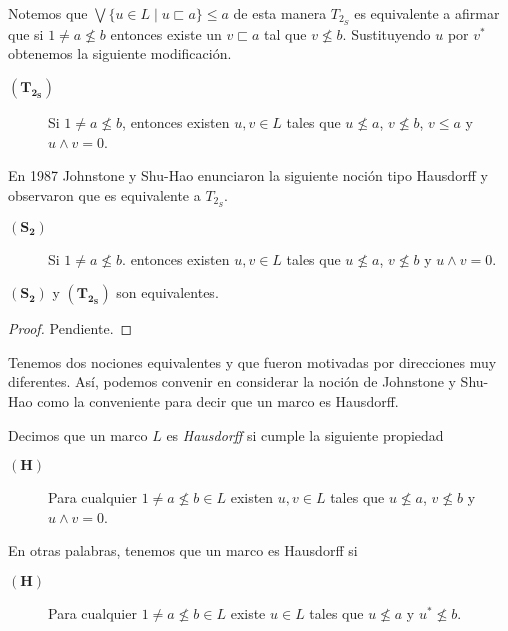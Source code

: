 Notemos que $\bigvee\{u\in L\mid u\sqsubset a\}\leq a$ de esta manera $T_{2_S}$ es equivalente a afirmar que si $1\neq a\nleq b$ entonces existe un $v\sqsubset a$ tal que $v\nleq b$. Sustituyendo $u$ por $v^*$ obtenemos la siguiente modificación.

\begin{description}
    \item[$\mathbf{(T_{2_S})}$] Si $1\neq a\nleq b$, entonces existen $u, v\in L$ tales que $u\nleq a$, $v\nleq b$, $v\leq a$ y $u\wedge v=0$. 
\end{description}

En 1987 Johnstone y Shu-Hao enunciaron la siguiente noción tipo Hausdorff y observaron que es equivalente a $T_{2_S}$.

\begin{description}
    \item[$\mathbf{(S_2)}$] Si $1\neq a\nleq b$. entonces existen $u, v\in L$ tales que $u\nleq a$, $v\nleq b$ y $u\wedge v=0$. 
\end{description}

\begin{prop}\label{Proposicion3.3.1}
    $\mathbf{(S_2)}$ y $\mathbf{(T_{2_S})}$ son equivalentes.
\end{prop}

\begin{proof}
    Pendiente.
\end{proof}

Tenemos dos nociones equivalentes y que fueron motivadas por direcciones muy diferentes. Así, podemos convenir en considerar la noción de Johnstone y Shu-Hao como la conveniente para decir que un marco es Hausdorff.

\begin{dfn}\label{MarcoHausdorff}
    Decimos que un marco $L$ es \emph{Hausdorff} si cumple la siguiente propiedad
    \begin{description}
        \item[$\mathbf{(H)}$] Para cualquier $1\neq a\nleq b\in L$ existen $u, v\in L$ tales que $u\nleq a$, $v\nleq b$ y $u\wedge v=0$. 
    \end{description}
\end{dfn}
En otras palabras, tenemos que un marco es Hausdorff si
\begin{description}
    \item[$\mathbf{(H)}$]  Para cualquier $1\neq a\nleq b\in L$ existe $u\in L$ tales que $u\nleq a$ y $u^*\nleq b$. 
\end{description}

